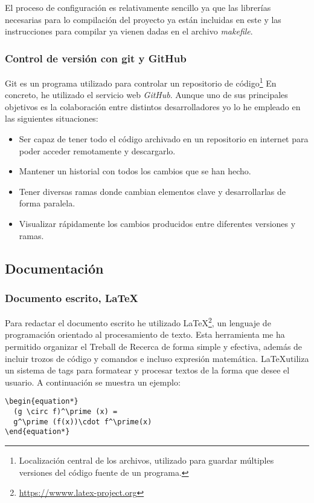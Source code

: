 El proceso de configuración es relativamente sencillo ya que las librerías necesarias para lo compilación del proyecto ya están incluidas en este y las instrucciones para compilar ya vienen dadas en el archivo \textit{makefile}.

\subsubsection{Control de versión con git y GitHub}
Git es un programa utilizado para controlar un repositorio de código\footnote{Localización central de los archivos, utilizado para guardar múltiples versiones del código fuente de un programa.} En concreto, he utilizado el servicio web \textit{GitHub}. Aunque uno de sus principales objetivos es la colaboración entre distintos desarrolladores yo lo he empleado en las siguientes situaciones:
\begin{itemize}
\item{Ser capaz de tener todo el código archivado en un repositorio en internet para poder acceder remotamente y descargarlo.}
\item{Mantener un historial con todos los cambios que se han hecho.}
\item{Tener diversas ramas donde cambian elementos clave y desarrollarlas de forma paralela.}
\item{Visualizar rápidamente los cambios producidos entre diferentes versiones y ramas.}
\end{itemize}
\newpage 
\subsection{Documentación}
\subsubsection{Documento escrito, \LaTeX}
Para redactar el documento escrito he utilizado \LaTeX \footnote{\url{https://wwww.latex-project.org}}, un lenguaje de programación orientado al procesamiento de texto. Esta herramienta me ha permitido organizar el Treball de Recerca de forma simple y efectiva, además de incluir trozos de código y comandos e incluso expresión matemática. \LaTeX utiliza un sistema de tags para formatear y procesar textos de la forma que desee el usuario. A continuación se muestra un ejemplo:
\begin{lstlisting}
\begin{equation*}
  (g \circ f)^\prime (x) =
  g^\prime (f(x))\cdot f^\prime(x)
\end{equation*}  
\end{lstlisting}

